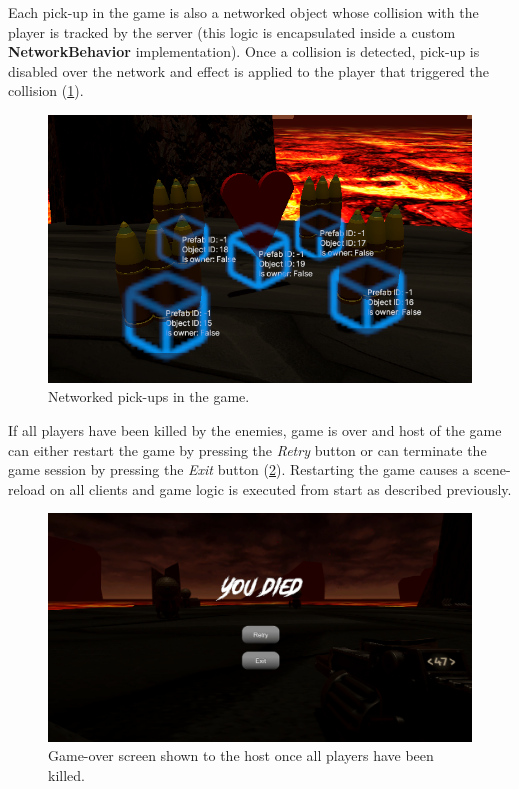\documentclass[times, utf8, diplomski]{fer}
\begin{document}
Each pick-up in the game is also a networked object whose collision with the player is tracked by the server (this logic is encapsulated inside a custom \textbf{NetworkBehavior} implementation). Once a collision is detected, pick-up is disabled over the network and effect is applied to the player that triggered the collision (\ref{fig:game-pick-ups-networked}).

\begin{figure}[H]
	\centering
	\includegraphics[scale=0.85]{Game-pick-ups-networked}
	\caption{Networked pick-ups in the game.}
	\label{fig:game-pick-ups-networked}
\end{figure}

If all players have been killed by the enemies, game is over and host of the game can either restart the game by pressing the \textit{Retry} button or can terminate the game session by pressing the \textit{Exit} button (\ref{fig:game-over}). Restarting the game causes a scene-reload on all clients and game logic is executed from start as described previously.

\begin{figure}[H]
	\centering
	\includegraphics[scale=0.5]{Game-over}
	\caption{Game-over screen shown to the host once all players have been killed.}
	\label{fig:game-over}
\end{figure}
\end{document}
